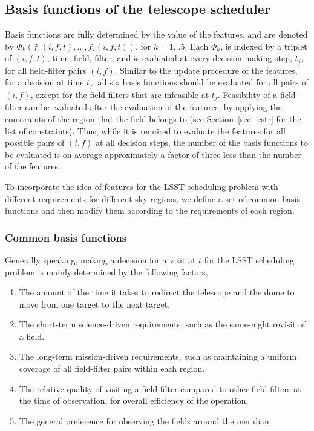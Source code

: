 \documentclass[12pt]{aastex62}
\theoremstyle{definition}
\begin{document}
\subsection{Basis functions of the telescope scheduler}\label{sec_lsst_bfs}

Basis functions are fully determined by the value of the features, and are denoted by $\Phi_k(f_1(i,f,t),\dots, f_7(i,f,t))$, for $k = 1 \dots 5$. Each $\Phi_k$, is indexed by a triplet of $(i,f,t)$, time, field, filter, and is evaluated at every decision making step, $t_j$, for all field-filter pairs $(i,f)$. Similar to the update procedure of the features, for a decision at time $t_j$, all six basis functions should be evaluated for all pairs of $(i,f)$, except for the field-filters that are infeasible at $t_j$. Feasibility of a field-filter can be evaluated after the evaluation of the features, by applying the constraints of the region that the field belongs to (see Section~\ref{sec_cstr} for the list of constraints). Thus, while it is required to evaluate the features for all possible pairs of $(i,f)$ at all decision steps, the number of the basis functions to be evaluated is on average approximately a factor of three less than the number of the features.

To incorporate the idea of features for the LSST scheduling problem with different requirements for different sky regions, we define a  set of common basis functions and then modify them according to the requirements of each region. 

\subsubsection{Common basis functions}
Generally speaking, making a decision for a visit at $t$ for the LSST scheduling problem is mainly determined by the following factors,

\begin{enumerate}
\item The amount of the time it takes to redirect the telescope and the dome to move from one target to the next target.
\item The short-term science-driven requirements, such as the same-night revisit of a field.
\item The long-term mission-driven requirements, such as maintaining a uniform coverage of all field-filter pairs within each region.
\item The relative quality of visiting a field-filter compared to other field-filters at the time of observation, for overall efficiency of the operation.
\item The general preference for observing the fields around the meridian.
\end{enumerate}
\end{document}
